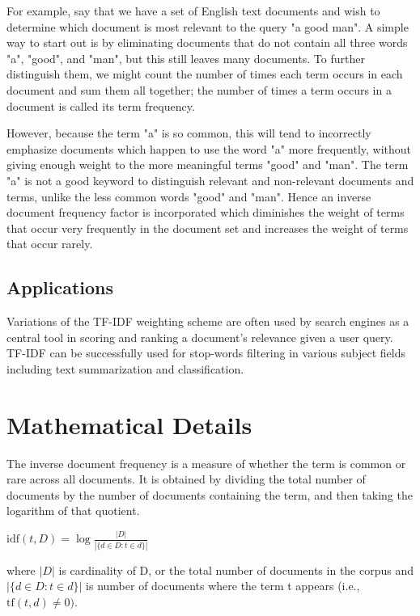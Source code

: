 For example, say that we have a set of English text documents and wish to determine which document is most relevant to the query "a good man". A simple way to start out is by eliminating documents that do not contain all three words "a", "good", and "man", but this still leaves many documents. To further distinguish them, we might count the number of times each term occurs in each document and sum them all together; the number of times a term occurs in a document is called its term frequency.

However, because the term "a" is so common, this will tend to incorrectly emphasize documents which happen to use the word "a" more frequently, without giving enough weight to the more meaningful terms "good" and "man". The term "a" is not a good keyword to distinguish relevant and non-relevant documents and terms, unlike the less common words "good" and "man". Hence an inverse document frequency factor is incorporated which diminishes the weight of terms that occur very frequently in the document set and increases the weight of terms that occur rarely.

\subsection{Applications}

Variations of the TF-IDF weighting scheme are often used by search engines as a central tool in scoring and ranking a document's relevance given a user query. TF-IDF can be successfully used for stop-words filtering in various subject fields including text summarization and classification.


\section{Mathematical Details}\label{sec:bg_detail}

The inverse document frequency is a measure of whether the term is common or rare across all documents. It is obtained by dividing the total number of documents by the number of documents containing the term, and then taking the logarithm of that quotient.

\begin{center}
\smallskip
$\mathrm{idf}(t, D) = \log \frac{\displaystyle |D|}{\displaystyle |\{d \in D: t \in d\}|}$
\smallskip
\end{center}


where $|D|$ is cardinality of D, or the total number of documents in the corpus and $|\{d \in D: t \in d\}|$ is number of documents where the term t appears (i.e., $\mathrm{tf}(t,d) \neq 0)$. \\

